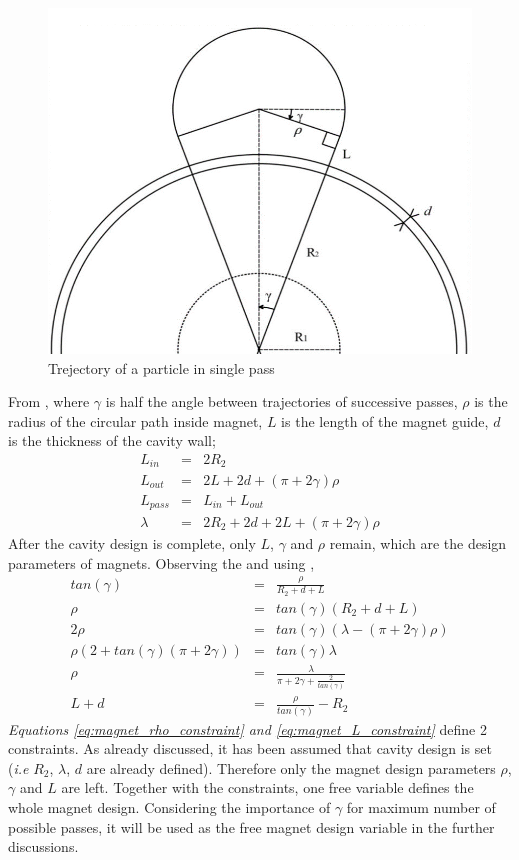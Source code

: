 \documentclass[a4paper,oneside,12pt]{report}
\numberwithin{equation}{chapter}
\begin{document}
\begin{figure}[H]    
    \centering
    \includegraphics[width=.8\linewidth]{./figures/design/magnet_design.png}
    \caption{Trejectory of a particle in single pass}
    \label{fig:magnet_design}
\end{figure}
From , where $\gamma$ is half the angle between trajectories of successive passes, $\rho$ is the radius of the circular path inside magnet, $L$ is the length of the magnet guide, $d$ is the thickness of the cavity wall;
\begin{eqnarray}
    L_{in} &=& 2R_2 \nonumber\\
    L_{out} &=& 2L + 2d + (\pi + 2\gamma)\rho \nonumber \\
    L_{pass} &=& L_{in} + L_{out}  \nonumber \\
    \lambda &=& 2R_2 + 2d + 2L + (\pi + 2\gamma)\rho \label{eq:magnet_lambda_constraint}
\end{eqnarray}
After the cavity design is complete, only $L$, $\gamma$ and $\rho$ remain, which are the design parameters of magnets.
Observing the  and using ,
\begin{eqnarray}
    tan(\gamma) &=& \frac{\rho}{R_2 + d + L} \nonumber \\
    \rho &=&  tan(\gamma) (R_2 + d + L) \nonumber\\
    2\rho &=& tan(\gamma) (\lambda - (\pi + 2\gamma)\rho) \nonumber\\
    \rho (2 + tan(\gamma)(\pi + 2\gamma)) &=&  tan(\gamma) \lambda \nonumber\\
    \rho &=& \frac{\lambda}{\pi + 2\gamma + \frac{2}{tan(\gamma)}} \label{eq:magnet_rho_constraint} \\
    L + d &=& \frac{\rho}{tan(\gamma)} - R_2 \label{eq:magnet_L_constraint}
\end{eqnarray}
\textit{Equations \ref{eq:magnet_rho_constraint} and \ref{eq:magnet_L_constraint}} define 2 constraints. As already discussed, it has been assumed that cavity design is set (\textit{i.e} $R_2$, $\lambda$, $d$ are already defined).
Therefore only the magnet design parameters $\rho$, $\gamma$ and $L$ are left. Together with the constraints, one free variable defines the whole magnet design. 
Considering the importance of $\gamma$ for maximum number of possible passes, it will be used as the free magnet design variable in the further discussions.
\end{document}
